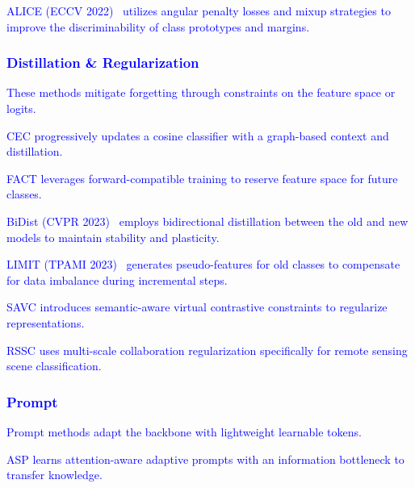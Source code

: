 ﻿\documentclass[letterpaper,journal]{IEEEtran}
\begin{document}
\textcolor{blue}{ALICE (ECCV 2022)~\cite{peng2022alice} utilizes angular penalty losses and mixup strategies to improve the discriminability of class prototypes and margins.}

\subsubsection{\textcolor{blue}{Distillation \& Regularization}}
\textcolor{blue}{These methods mitigate forgetting through constraints on the feature space or logits.}

\textcolor{blue}{CEC \cite{zhang2021} progressively updates a cosine classifier with a graph-based context and distillation.}

\textcolor{blue}{FACT \cite{zhou2022} leverages forward-compatible training to reserve feature space for future classes.}

\textcolor{blue}{BiDist (CVPR 2023)~\cite{zhao2023bidist} employs bidirectional distillation between the old and new models to maintain stability and plasticity.}

\textcolor{blue}{LIMIT (TPAMI 2023)~\cite{zhou2023limit} generates pseudo-features for old classes to compensate for data imbalance during incremental steps.}

\textcolor{blue}{SAVC \cite{song2023savc} introduces semantic-aware virtual contrastive constraints to regularize representations.}

\textcolor{blue}{RSSC \cite{nwpu_cankao} uses multi-scale collaboration regularization specifically for remote sensing scene classification.}

\subsubsection{\textcolor{blue}{Prompt}}
\textcolor{blue}{Prompt methods adapt the backbone with lightweight learnable tokens.}

\textcolor{blue}{ASP \cite{liu2024} learns attention-aware adaptive prompts with an information bottleneck to transfer knowledge.}
\end{document}
